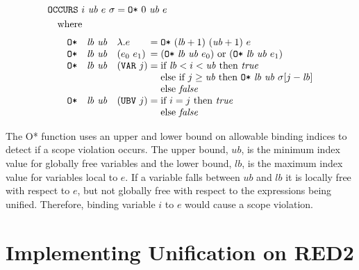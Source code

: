\[
\begin{aligned}
&\THOR{OCCURS}\ i\ \mathit{ub}\ e\ \sigma = \THOR{O*}\ 0\ \mathit{ub}\ e\\
&\quad\text{where}\\[.25em]
&\qquad\begin{array}{@{}lll@{\;}l@{\;}l@{}}
\THOR{O*}&\mathit{lb}\ \mathit{ub}&\lambda.e &=& \THOR{O*}\ (\mathit{lb}+1)\ (\mathit{ub}+1)\ e\\
\THOR{O*}&\mathit{lb}\ \mathit{ub}&(e_0\ e_1) &=& (\THOR{O*}\ \mathit{lb}\ \mathit{ub}\ e_0)\ \text{or}\ (\THOR{O*}\ \mathit{lb}\ \mathit{ub}\ e_1)\\
\THOR{O*}&\mathit{lb}\ \mathit{ub}&(\THOR{VAR}\ j) &=& \text{if }\mathit{lb}<i<\mathit{ub}\text{ then }\mathit{true}\\
&&&&\text{else if }j\geq\mathit{ub}\text{ then }\THOR{O*}\ \mathit{lb}\ \mathit{ub}\ \sigma[j-\mathit{lb}]\\
&&&&\text{else }\mathit{false}\\
\THOR{O*}&\mathit{lb}\ \mathit{ub}&(\THOR{UBV}\ j) &=& \text{if }i=j\text{ then }\mathit{true}\\
&&&&\text{else }\mathit{false}
\end{array}
\end{aligned}
\]

The O* function uses an upper and lower bound on allowable binding indices to
detect if a scope violation occurs. The upper bound, \(\mathit{ub}\), is the minimum
index value for globally free variables and the lower bound, \(\mathit{lb}\), is the
maximum index value for variables local to \(e\). If a variable falls between
\(\mathit{ub}\) and \(\mathit{lb}\) it is locally free with respect to \(e\), but not globally free
with respect to the expressions being unified. Therefore, binding variable
\(i\) to \(e\) would cause a scope violation.

\section{Implementing Unification on RED2}

